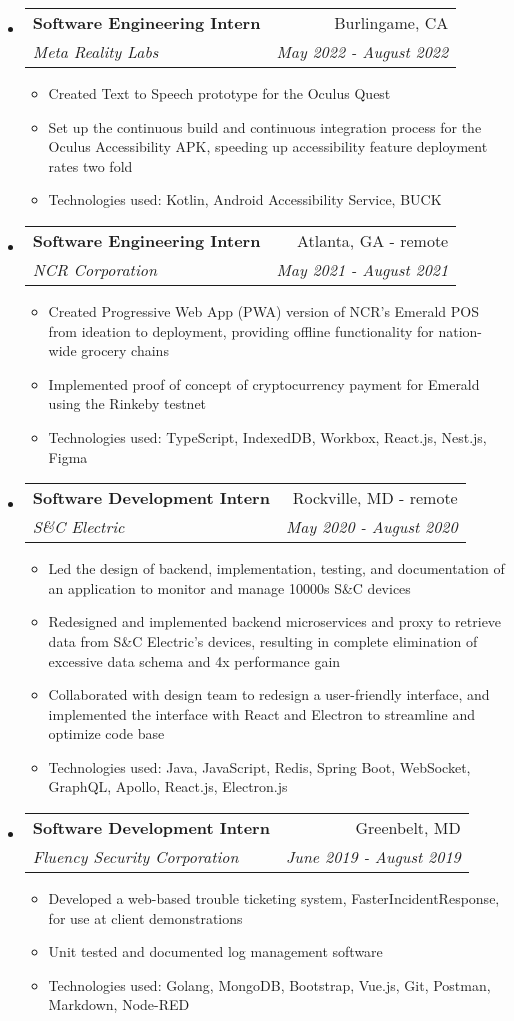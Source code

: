 \documentclass[letterpaper,10pt]{article}
\makeatletter
\newcommand{\resitem}[1]{\item #1 \vspace{-3.5pt}}
\newcommand{\ressubheading}[4]{
\begin{tabular*}{7.0in}{l@{\extracolsep{\fill}}r}
		\textbf{#1} & #2 \\
		\textit{#3} & \textit{#4} \\
\end{tabular*}\vspace{-6pt}}
\makeatother
\begin{document}
\begin{itemize}
\item
    \ressubheading{Software Engineering Intern}{Burlingame, CA}{Meta Reality Labs}{May 2022 - August 2022}
    \begin{itemize}
        \resitem{Created Text to Speech prototype for the Oculus Quest}
        \resitem{Set up the continuous build and continuous integration process for the Oculus Accessibility APK, speeding up accessibility feature deployment rates two fold}
        \resitem{Technologies used: Kotlin, Android Accessibility Service, BUCK}
    \end{itemize}
\item
    \ressubheading{Software Engineering Intern}{Atlanta, GA - remote}{NCR Corporation}{May 2021 - August 2021}
    \begin{itemize}
        \resitem{Created Progressive Web App (PWA) version of NCR's Emerald POS from ideation to deployment, providing offline functionality for nation-wide grocery chains}
        \resitem{Implemented proof of concept of cryptocurrency payment for Emerald using the Rinkeby testnet}
        \resitem{Technologies used: TypeScript, IndexedDB, Workbox, React.js, Nest.js, Figma}
    \end{itemize}
\item
    \ressubheading{Software Development Intern}{Rockville, MD - remote}{S\&C Electric}{May 2020 - August 2020}
    \begin{itemize}
        \resitem{Led the design of backend, implementation, testing, and documentation of an application to monitor and manage 10000s S\&C devices}
        \resitem{Redesigned and implemented backend microservices and proxy to retrieve data from S\&C Electric's devices, resulting in complete elimination of excessive data schema and 4x performance gain}
        \resitem{Collaborated with design team to redesign a user-friendly interface, and implemented the interface with React and Electron to streamline and optimize code base}
        \resitem{Technologies  used: Java, JavaScript, Redis, Spring Boot, WebSocket, GraphQL, Apollo, React.js, Electron.js}
    \end{itemize}
\item
    \ressubheading{Software Development Intern}{Greenbelt, MD}{Fluency Security Corporation}{June 2019 - August 2019}
    \begin{itemize}
        \resitem{Developed a web-based trouble ticketing system, FasterIncidentResponse, for use at client demonstrations}
        \resitem{Unit tested and documented log management software}
        \resitem{Technologies used: Golang, MongoDB, Bootstrap, Vue.js, Git, Postman, Markdown, Node-RED}
    \end{itemize}
\end{itemize}
\end{document}
